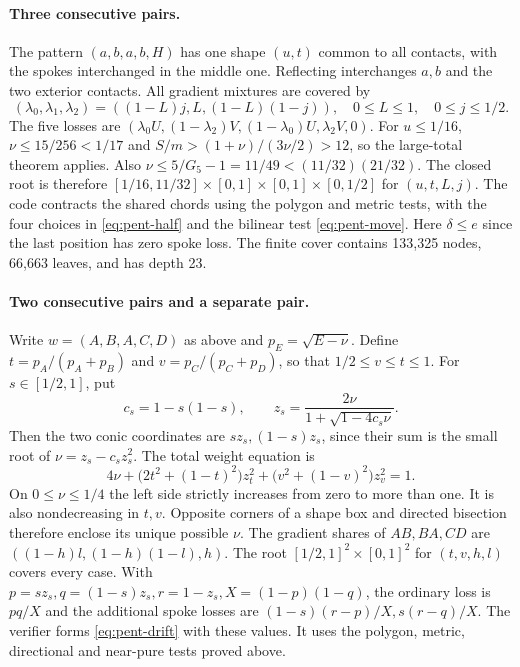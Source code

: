 \documentclass[11pt,a4paper]{article}
\theoremstyle{definition}
\begin{document}
\paragraph{Three consecutive pairs.}
The pattern $(a,b,a,b,H)$ has one shape $(u,t)$ common to all contacts,
with the spokes interchanged in the middle one. Reflecting interchanges
$a,b$ and the two exterior contacts. All gradient mixtures are covered by
\[
 (\lambda_0,\lambda_1,\lambda_2)=((1-L)j,L,(1-L)(1-j)),
 \quad 0\le L\le1,\quad 0\le j\le1/2 .
\]
The five losses are
$(\lambda_0 U,(1-\lambda_2)V,(1-\lambda_0)U,\lambda_2 V,0)$.
For $u\le1/16$, $\nu\le15/256<1/17$ and
$S/m>(1+\nu)/(3\nu/2)>12$, so the large-total theorem applies.
Also $\nu\le 5/G_5-1=11/49<(11/32)(21/32)$. The closed root is
therefore
$[1/16,11/32]\times[0,1]\times[0,1]\times[0,1/2]$
for $(u,t,L,j)$. The code contracts the shared chords using the polygon
and metric tests, with the four choices in \eqref{eq:pent-half} and the
bilinear test \eqref{eq:pent-move}. Here $\delta\le e$ since the last
position has zero spoke loss. The finite cover contains 133,325 nodes,
66,663 leaves, and has depth 23.

\paragraph{Two consecutive pairs and a separate pair.}
Write $w=(A,B,A,C,D)$ as above and $p_E=\sqrt{E-\nu}$. Define
$t=p_A/(p_A+p_B)$ and $v=p_C/(p_C+p_D)$, so that
$1/2\le v\le t\le1$. For $s\in[1/2,1]$, put
\[
 c_s=1-s(1-s),\qquad z_s=\frac{2\nu}{1+\sqrt{1-4c_s\nu}} .
\]
Then the two conic coordinates are $sz_s,(1-s)z_s$, since their sum
is the small root of $\nu=z_s-c_sz_s^2$. The total weight equation is
\[
 4\nu+\big(2t^2+(1-t)^2\big)z_t^2+
              \big(v^2+(1-v)^2\big)z_v^2=1.
\]
On $0\le\nu\le1/4$ the left side strictly increases from zero to more
than one. It is also nondecreasing in $t,v$. Opposite corners of a shape
box and directed bisection therefore enclose its unique possible $\nu$.
The gradient shares of $AB,BA,CD$ are $((1-h)l,(1-h)(1-l),h)$.
The root $[1/2,1]^2\times[0,1]^2$ for $(t,v,h,l)$ covers every case.
With $p=sz_s,q=(1-s)z_s,r=1-z_s,X=(1-p)(1-q)$, the ordinary loss is
$pq/X$ and the additional spoke losses are $(1-s)(r-p)/X,s(r-q)/X$.
The verifier forms \eqref{eq:pent-drift} with these values. It uses the
polygon, metric, directional and near-pure tests proved above.
\end{document}
